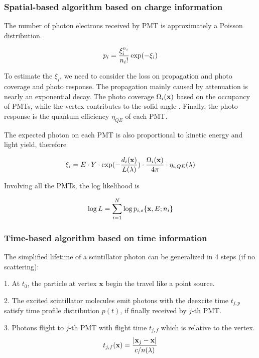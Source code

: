 \documentclass{article}
\begin{document}
\subsubsection{Spatial-based algorithm based on charge information}
\par The number of photon electrons received by PMT is approximately a Poisson distribution.
	
	\begin{equation}
	\numberwithin{equation}{section}
	p_i = \frac{\xi_i^{n_i}}{n_i!} \exp(-\xi_i)
	\end{equation}
	
	\par To estimate the $\xi_i$, we need to consider the loss on propagation and photo coverage and photo response. The propagation mainly caused by attenuation is nearly an exponential decay. The photo coverage $\Omega_i(\textbf x)$ based on the occupancy of PMTs, while the vertex contributes to the solid angle . Finally, the photo response is the quantum efficiency $\eta_{QE}$ of each PMT.
	
	\par The expected photon on each PMT is also proportional to kinetic energy and light yield, therefore
	
	\begin{equation}
	\numberwithin{equation}{section}
	\xi_i = E\cdot Y\cdot \exp(-\frac{d_i({\textbf x})}{L(\lambda)}) \cdot \frac{\Omega_i({\textbf x})}{4\pi} \cdot\eta_{i,QE}(\lambda)
	\end{equation}

	\par Involving all the PMTs, the log likelihood is
	
	\begin{equation}
	\numberwithin{equation}{section}
	\log L = \sum_{i=1}^N \log p_{i,s} \{{\textbf x},E;n_{i}\}
	\end{equation}
	
	\subsubsection{Time-based algorithm based on time information}

	\par The simplified lifetime of a scintillator photon can be generalized in 4 steps (if no scattering): 
	\par 1. At $t_0$, the particle at vertex $\textbf {x}$ begin the travel like a point source. 
	\par 2. The excited scintillator molecules emit photons with the deexcite time $t_{j,p}$ satisfy time profile distribution $p(t)$, if finally received by $j$-th PMT.
	\par 3. Photons flight to $j$-th PMT with flight time $t_{j,f}$ which is relative to the vertex.
	\begin{equation}
		\numberwithin{equation}{section}
		t_{j,f}(\textbf x)=\frac{{|\textbf x_j}-{\textbf x|}}{c/n(\lambda)}
	\end{equation}
	
\end{document}
